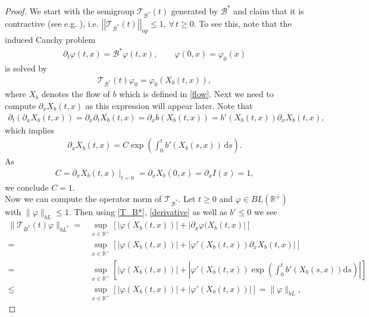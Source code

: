 \documentclass[12pt,a4paper]{amsart}
\newcommand{\ud}{\mathrm{d}}
\newcommand{\R}{\mathbb{R}}
\begin{document}
\begin{proof}
\noindent We start with the semigroup $\mathcal{T}_{\mathcal{B}^*}(t)$ generated by $\mathcal{B^*}$ and claim that it is contractive (see e.g. \cite[Ch.II]{EngelNagel}), i.e. $\left|\left|\mathcal{T}_{\mathcal{B}^*}(t)\right|\right|_{op}\le 1,\,\forall\,t\ge 0$. To see this, note that the induced Cauchy problem 
    \begin{align*}
    \partial_t\varphi(t,x)=\mathcal{B}^*\varphi(t,x), \qquad \varphi(0,x)=\varphi_0(x)
    \end{align*}
is solved by 
    \begin{align}
    \label{T_B*}
    \mathcal{T}_{\mathcal{B}^*}(t)\varphi_0=\varphi_0(X_b(t,x)),
    \end{align}
where $X_b$ denotes the flow of $b$ which is defined in \eqref{flow}.
Next we need to compute $\partial_x X_b(t,x)$ as this expression will appear later. Note that  
    \begin{align*}
    \partial_t\left(\partial_x X_b(t,x)\right)=\partial_x\partial_t X_b(t,x)=\partial_xb(X_b(t,x))
    =b'(X_b(t,x))\partial_x X_b(t,x),
    \end{align*}
which implies 
    \begin{align}
    \label{derivative}
\partial_x X_b(t,x)=C\exp\left(\int_0^tb'(X_b(s,x))\,\ud s\right).
    \end{align}
As 
    \begin{align*}
    C=\partial_x X_b(t,x)\mid_{t=0}=\partial_x X_b(0,x)=\partial_x I(x)=1, 
    \end{align*}
we conclude $C=1$.\\
Now we can compute the operator norm of $\mathcal{T}_{\mathcal{B}^*}$. Let $t\geq 0$ and $\varphi\in BL(\R^+)$ with $\|\varphi\|_{bL}\leq 1$. Then using \eqref{T_B*},  \eqref{derivative} as well as $b'\leq 0$  we see
    \begin{align*}
\|\mathcal{T}_{B^*}(t)\varphi\|_{bL^*}
=&\sup_{x\in \R^+}\left[|\varphi(X_b(t,x))|+|\partial_x\varphi(X_b(t,x)|\right]\\
=&\sup_{x\in \R^+}\left[|\varphi(X_b(t,x))|+|\varphi'(X_b(t,x))\partial_x X_b(t,x)|\right]\\
=&\sup_{x\in \R^+}\left[|\varphi(X_b(t,x))|+|\varphi'(X_b(t,x))\exp\left(\int_0^tb'(X_b(s,x))\ud s\right)|\right]\\
\leq& \sup_{x\in \R^+}\left[|\varphi(X_b(t,x))|+|\varphi'(X_b(t,x))|\right]=\|\varphi\|_{bL}, 
    \end{align*}

\end{proof}
\end{document}

